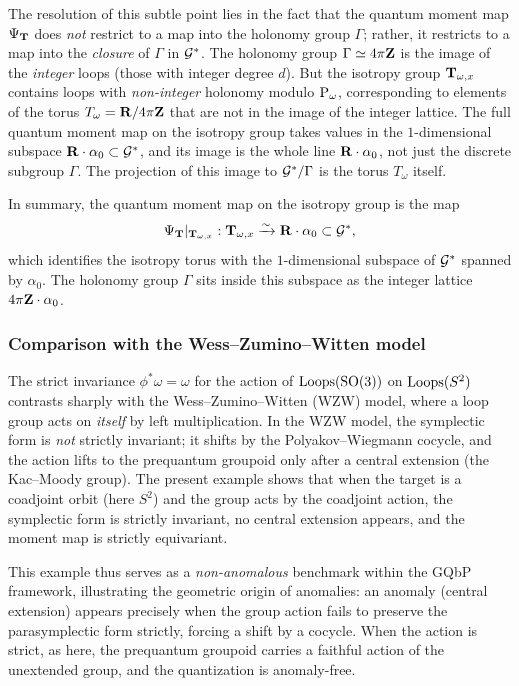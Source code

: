 \documentclass[11pt,reqno,letterpaper,twoside]{amsart}
\renewcommand{\TT}{\Groupoid{T}}
\begin{document}
The resolution of this subtle point lies in the fact that the quantum moment map
$\Psi_{\TT}$ does \emph{not} restrict to a map into the holonomy group $\Gamma$;
rather, it restricts to a map into the \emph{closure} of $\Gamma$ in $\mathcal{G}^{*}$.
The holonomy group $\Gamma \simeq 4\pi{\mathbf{Z}}$ is the image of the \emph{integer}
loops (those with integer degree $d$).  But the isotropy group $\TT_{\omega, x}$
contains loops with \emph{non-integer} holonomy modulo $\operatorname{P}_\omega$, corresponding
to elements of the torus $T_{\omega} = {\mathbf{R}}/4\pi{\mathbf{Z}}$ that are not in the image of
the integer lattice.  The full quantum moment map on the isotropy group takes
values in the $1$-dimensional subspace ${\mathbf{R}} \cdot \alpha_{0} \subset \mathcal{G}^{*}$,
and its image is the whole line ${\mathbf{R}} \cdot \alpha_{0}$, not just the discrete
subgroup $\Gamma$.  The projection of this image to $\mathcal{G}^{*}/\Gamma$ is the
torus $T_{\omega}$ itself.

In summary, the quantum moment map on the isotropy group is the map
\[
\Psi_{\TT}|_{\TT_{\omega, x}} : \TT_{\omega, x} \xrightarrow{\sim} \RR \cdot \alpha_{0} \subset \cG^{*},
\]
which identifies the isotropy torus with the $1$-dimensional subspace of $\mathcal{G}^{*}$
spanned by $\alpha_{0}$.  The holonomy group $\Gamma$ sits inside this subspace
as the integer lattice $4\pi{\mathbf{Z}} \cdot \alpha_{0}$.

\subsubsection{Comparison with the Wess--Zumino--Witten model}

The strict invariance $\phi^{*}\omega = \omega$ for the action of
$\operatorname{Loops}(\mathrm{SO}(3))$ on $\operatorname{Loops}(S^{2})$ contrasts sharply with the
Wess--Zumino--Witten (WZW) model, where a loop group acts on \emph{itself}
by left multiplication.  In the WZW model, the symplectic form is \emph{not}
strictly invariant; it shifts by the Polyakov--Wiegmann cocycle, and the
action lifts to the prequantum groupoid only after a central extension
(the Kac--Moody group).  The present example shows that when the target
is a coadjoint orbit (here $S^{2}$) and the group acts by the coadjoint
action, the symplectic form is strictly invariant, no central extension
appears, and the moment map is strictly equivariant.

This example thus serves as a \emph{non-anomalous} benchmark within the
GQbP framework, illustrating the geometric origin of anomalies:
an anomaly (central extension) appears precisely when the group action
fails to preserve the parasymplectic form strictly, forcing a shift by
a cocycle.  When the action is strict, as here, the prequantum groupoid
carries a faithful action of the unextended group, and the quantization
is anomaly-free.
\end{document}
